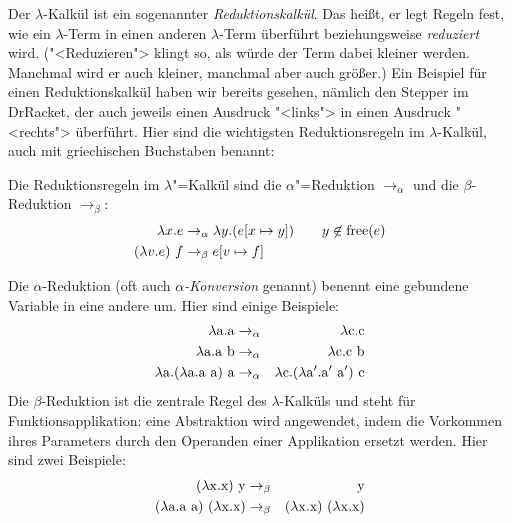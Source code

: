 Der $\lambda$-Kalkül ist ein sogenannter
\textit{Reduktionskalkül}. Das heißt, er legt
Regeln fest, wie ein $\lambda$-Term in einen anderen $\lambda$-Term
überführt beziehungsweise \textit{reduziert} wird.  ("<Reduzieren">
klingt so, als würde der Term dabei kleiner werden.  Manchmal wird er
auch kleiner, manchmal aber auch größer.)  Ein Beispiel für einen
Reduktionskalkül haben wir bereits gesehen, nämlich den Stepper im
DrRacket, der auch jeweils einen Ausdruck "<links"> in einen Ausdruck
"<rechts"> überführt.  Hier sind die wichtigsten Reduktionsregeln im
$\lambda$-Kalkül, auch mit griechischen Buchstaben benannt:
%
\begin{definition}[Reduktionsregeln]
  Die Reduktionsregeln im $\lambda$"=Kalkül sind
  die $\alpha$"=Reduktion $\rightarrow_{\alpha}$ und die
  $\beta$-Reduktion $\rightarrow_{\beta}$:%
  \begin{alignat*}{2}
    \lambda x.e & \rightarrow_{\alpha} \lambda y.(e[x\mapsto y]) \quad 
    & y\not\in\operatorname{free}(e)
    \\
    (\lambda v.e)~f & \rightarrow_{\beta} e[v\mapsto f]
  \end{alignat*}
\end{definition}
%
Die $\alpha$-Reduktion (oft auch \textit{$\alpha$-Konversion} genannt)
benennt eine gebundene Variable in eine andere um.  Hier sind einige
Beispiele:
%
\begin{eqnarray*}
  \lambda \mathrm a.\mathrm a & \rightarrow_{\alpha} & \lambda \mathrm c.\mathrm c\\
  \lambda \mathrm a.\mathrm a~\mathrm b & \rightarrow_{\alpha} & \lambda \mathrm c.\mathrm c~\mathrm b\\
  \lambda \mathrm a.(\lambda \mathrm a.\mathrm a~\mathrm a)~\mathrm a & \rightarrow_{\alpha} & 
  \lambda \mathrm c.(\lambda \mathrm a'.\mathrm a'~\mathrm a')~\mathrm c
\end{eqnarray*}
%
Die $\beta$-Reduktion ist die zentrale Regel des $\lambda$-Kalküls und steht für
Funktionsapplikation: eine Abstraktion
wird angewendet, indem die Vorkommen ihres Parameters durch den
Operanden einer Applikation ersetzt werden.  Hier sind zwei
Beispiele:
%
\begin{eqnarray*}
  (\lambda \mathrm x.\mathrm x)~\mathrm y & \rightarrow_{\beta} & \mathrm y\\
  (\lambda \mathrm a.\mathrm a~\mathrm a)~(\lambda \mathrm x.\mathrm x) & \rightarrow_{\beta}
  & (\lambda \mathrm x.\mathrm x)~(\lambda \mathrm x.\mathrm x)
\end{eqnarray*}
